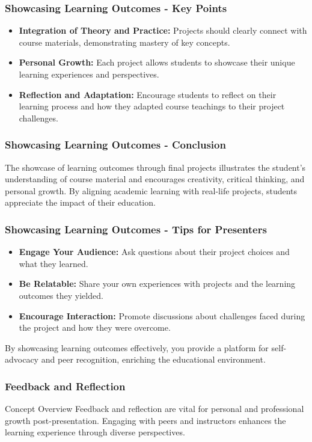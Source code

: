 \documentclass[aspectratio=169]{beamer}
\begin{document}
\begin{frame}[fragile]
    \frametitle{Showcasing Learning Outcomes - Key Points}
    \begin{itemize}
        \item \textbf{Integration of Theory and Practice:} Projects should clearly connect with course materials, demonstrating mastery of key concepts.
        \item \textbf{Personal Growth:} Each project allows students to showcase their unique learning experiences and perspectives.
        \item \textbf{Reflection and Adaptation:} Encourage students to reflect on their learning process and how they adapted course teachings to their project challenges.
    \end{itemize}
\end{frame}

\begin{frame}[fragile]
    \frametitle{Showcasing Learning Outcomes - Conclusion}
    The showcase of learning outcomes through final projects illustrates the student’s understanding of course material and encourages creativity, critical thinking, and personal growth. By aligning academic learning with real-life projects, students appreciate the impact of their education.
\end{frame}

\begin{frame}[fragile]
    \frametitle{Showcasing Learning Outcomes - Tips for Presenters}
    \begin{itemize}
        \item \textbf{Engage Your Audience:} Ask questions about their project choices and what they learned.
        \item \textbf{Be Relatable:} Share your own experiences with projects and the learning outcomes they yielded.
        \item \textbf{Encourage Interaction:} Promote discussions about challenges faced during the project and how they were overcome.
    \end{itemize}
    
    By showcasing learning outcomes effectively, you provide a platform for self-advocacy and peer recognition, enriching the educational environment.
\end{frame}

\begin{frame}[fragile]
    \frametitle{Feedback and Reflection}
    \begin{block}{Concept Overview}
        Feedback and reflection are vital for personal and professional growth post-presentation. Engaging with peers and instructors enhances the learning experience through diverse perspectives.
    \end{block}
\end{frame}
\end{document}
